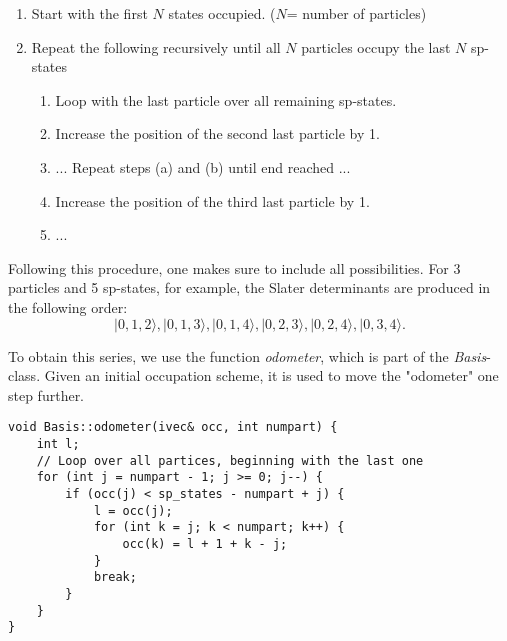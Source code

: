 \begin{framed}
\begin{enumerate}
\item Start with the first $N$ states occupied. ($N$= number of particles)
\item Repeat the following recursively until all $N$ particles occupy the last $N$ sp-states
\begin{enumerate}
\item Loop with the last particle over all remaining sp-states.
\item Increase the position of the second last particle by 1.
\item ... Repeat steps (a) and (b) until end reached ...
\item Increase the position of the third last particle by 1.
\item ...
\end{enumerate}
\end{enumerate}
\end{framed}

Following this procedure, one makes sure to include all possibilities. For 3 particles and 5 sp-states, for example, the Slater determinants are produced in the following order:
\[
|0,1,2\rangle, |0,1,3\rangle, |0,1,4\rangle, |0,2,3\rangle, |0,2,4\rangle, |0,3,4\rangle.
\]

To obtain this series, we use the function \textit{odometer}, which is part of the \textit{Basis}-class. Given an initial occupation scheme, it is used to move the "odometer" one step further.

\begin{lstlisting}[backgroundcolor=\color{lighter-gray},caption={The function \textit{odometer} accepts the $N$-dimensional array \textit{occ} with the current occupation scheme of the $N$ particles and returns the next one, using the odometer algorithm.}, label=lst:odometer]
void Basis::odometer(ivec& occ, int numpart) {
    int l;
    // Loop over all partices, beginning with the last one
    for (int j = numpart - 1; j >= 0; j--) {
        if (occ(j) < sp_states - numpart + j) {
            l = occ(j);
            for (int k = j; k < numpart; k++) {
                occ(k) = l + 1 + k - j;
            }
            break;
        }
    }
}
\end{lstlisting}


